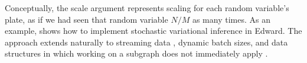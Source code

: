 Conceptually, the scale argument represents scaling for each random
variable's plate, as if we had seen that random variable $N / M$ as
many times.  As an example,  shows how to implement
stochastic variational inference in Edward.
The approach extends naturally to streaming data
\citep{doucet2000on,broderick2013streaming,mcinerney2015population},
dynamic batch sizes, and data structures in which working on a
subgraph does not immediately apply
\citep{binder1997space,johnson2014stochastic,foti2014stochastic}.


